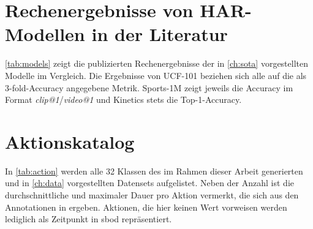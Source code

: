 \chapter{Rechenergebnisse von HAR-Modellen in der Literatur}
\label{ch:leaderboard}

\autoref{tab:models} zeigt die publizierten Rechenergebnisse der in \autoref{ch:sota} vorgestellten Modelle im Vergleich.
Die Ergebnisse von UCF-101 beziehen sich alle auf die als 3-fold-Accuracy angegebene Metrik.
Sports-1M zeigt jeweils die Accuracy im Format \emph{clip@1}/\emph{video@1} und Kinetics stets die Top-1-Accuracy.

\begin{figure}
    \label{tab:models}
\end{figure}

\chapter{Aktionskatalog}
\label{ch:aktionskatalog}

In \autoref{tab:action} werden alle 32 Klassen des im Rahmen dieser Arbeit generierten und in \autoref{ch:data} vorgestellten Datensets aufgelistet.
Neben der Anzahl ist die durchschnittliche und maximaler Dauer pro Aktion vermerkt, die sich aus den Annotationen in \cite{Statsbomb20} ergeben.
Aktionen, die hier keinen Wert vorweisen werden lediglich als Zeitpunkt in \gls{sbod} repräsentiert.

\begin{figure}
    \centering
    \begin{subfigure}{0.45\textwidth}
        \centering
    \end{subfigure}
    \begin{subfigure}{0.45\textwidth}
        \centering
    \end{subfigure}
    \label{tab:action}
\end{figure}
